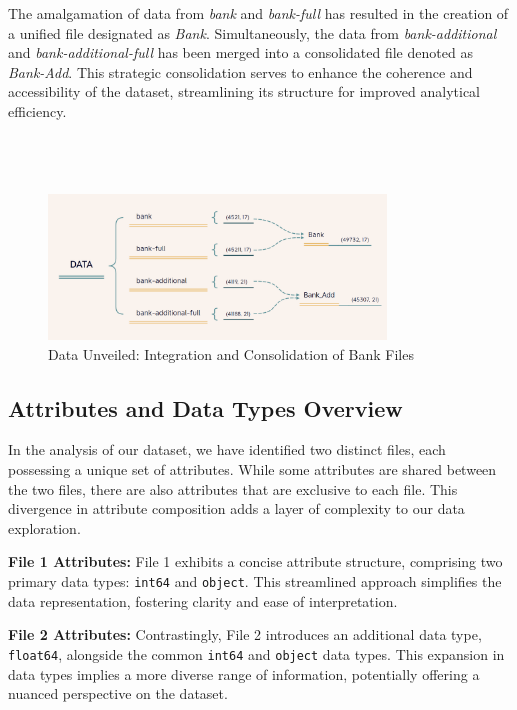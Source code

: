\documentclass{article}
\begin{document}
The amalgamation of data from \textit{bank} and \textit{bank-full} has resulted in the creation of a unified file designated as \textit{Bank}. Simultaneously, the data from \textit{bank-additional} and \textit{bank-additional-full} has been merged into a consolidated file denoted as \textit{Bank-Add}. This strategic consolidation serves to enhance the coherence and accessibility of the dataset, streamlining its structure for improved analytical efficiency.
\\ \\ \\ \\
\begin{figure}[h]
    \centering
    \includegraphics[width=0.8\textwidth]{data/bank_marketing/pic/Data.png}
    \caption{Data Unveiled: Integration and Consolidation of Bank Files}
    \label{fig:data_unveiled}
\end{figure}


\subsection{Attributes and Data Types Overview}
In the analysis of our dataset, we have identified two distinct files, each possessing a unique set of attributes. While some attributes are shared between the two files, there are also attributes that are exclusive to each file. This divergence in attribute composition adds a layer of complexity to our data exploration.

\textbf{File 1 Attributes:}
File 1 exhibits a concise attribute structure, comprising two primary data types: \texttt{int64} and \texttt{object}. This streamlined approach simplifies the data representation, fostering clarity and ease of interpretation.

\textbf{File 2 Attributes:}
Contrastingly, File 2 introduces an additional data type, \texttt{float64}, alongside the common \texttt{int64} and \texttt{object} data types. This expansion in data types implies a more diverse range of information, potentially offering a nuanced perspective on the dataset.
\end{document}
